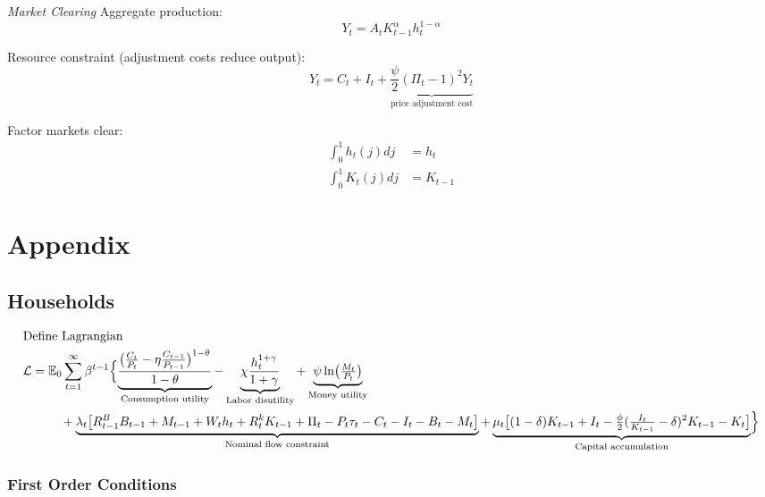 \documentclass[11pt,preprint]{elsarticle}
\numberwithin{equation}{section}
\numberwithin{figure}{section}
\numberwithin{table}{section}
\begin{document}
\emph{Market Clearing} Aggregate production: \begin{equation}
Y_t = A_t K_{t-1}^{\alpha} h_t^{1-\alpha}
\label{aggregate_production}
\end{equation}

Resource constraint (adjustment costs reduce output): \begin{equation}
Y_t = C_t + I_t + \underbrace{\frac{\psi}{2} (\Pi_t - 1)^2 Y_t}_{\text{price adjustment cost}}
\label{resource_constraint}
\end{equation}

Factor markets clear: \begin{align}
\int_0^1 h_t(j) dj &= h_t \\
\int_0^1 K_t(j) dj &= K_{t-1}
\end{align}

\newpage
\newpage

\section{Appendix}\label{appendix}

\subsection{Households}\label{households-1}

\begin{align*}
  & \text{Define Lagrangian} \\
  & \mathcal{L} = \mathbb{E}_0 \sum_{t=1}^{\infty} \beta^{t-1} \Bigl\{
    \underbrace{\frac{\bigl(\tfrac{C_t}{P_t}-\eta\tfrac{C_{t-1}}{P_{t-1}}\bigr)^{1-\theta}}{1-\theta}}_{\text{Consumption utility}}
    - \underbrace{\chi\frac{h_t^{1+\gamma}}{1+\gamma}}_{\text{Labor disutility}}
    + \underbrace{\psi\ln\bigl(\tfrac{M_t}{P_t}\bigr)}_{\text{Money utility}} \\
  & \quad\qquad
    + \underbrace{\lambda_t\bigl[R^B_{t-1}B_{t-1}+M_{t-1}+W_th_t+R^k_tK_{t-1}+\Pi_t-P_t\tau_t-C_t-I_t-B_t-M_t\bigr]}_{\text{Nominal flow constraint}}
    + \underbrace{\mu_t\bigl[(1-\delta)K_{t-1}+I_t-\tfrac{\phi}{2}(\tfrac{I_t}{K_{t-1}}-\delta)^2K_{t-1}-K_t\bigr]}_{\text{Capital accumulation}}
  \Bigr\}
\end{align*}

\subsubsection{\texorpdfstring{First Order Conditions
\label{household_FOC}}{First Order Conditions }}\label{first-order-conditions}
\end{document}
